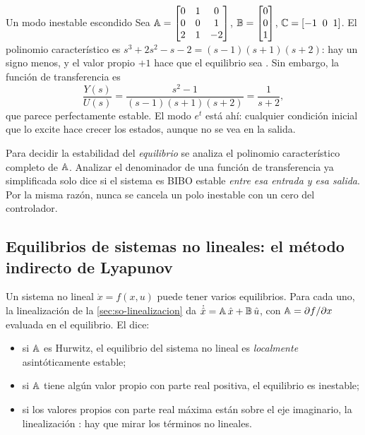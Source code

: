 \begin{ejemplo}[label=ej:es-escondido]{Un modo inestable escondido}
Sea $\mathbb{A}=\begin{bmatrix}0&1&0\\0&0&1\\2&1&-2\end{bmatrix}$, $\mathbb{B}=\begin{bmatrix}0\\0\\1\end{bmatrix}$, $\mathbb{C}=[-1\;\;0\;\;1]$.
\solucion El polinomio característico es $s^3+2s^2-s-2=(s-1)(s+1)(s+2)$: hay un signo menos, y el valor propio $+1$ hace que el equilibrio sea . Sin embargo, la función de transferencia es
\[
  \frac{Y(s)}{U(s)}=\frac{s^2-1}{(s-1)(s+1)(s+2)}=\frac{1}{s+2},
\]
que parece perfectamente estable. El modo $e^{t}$ está ahí: cualquier condición inicial que lo excite hace crecer los estados, aunque no se vea en la salida.
\end{ejemplo}

\begin{cuidado}
Para decidir la estabilidad del \emph{equilibrio} se analiza el polinomio característico completo de $\mathbb{A}$. Analizar el denominador de una función de transferencia ya simplificada solo dice si el sistema es BIBO estable \emph{entre esa entrada y esa salida}. Por la misma razón, nunca se cancela un polo inestable con un cero del controlador.
\end{cuidado}


\subsection*{Equilibrios de sistemas no lineales: el método indirecto de Lyapunov}

Un sistema no lineal $\dot x=f(x,u)$ puede tener varios equilibrios. Para cada uno, la linealización de la \cref{sec:so-linealizacion} da $\dot{\hat{x}}=\mathbb{A}\,\hat{x}+\mathbb{B}\,\hat{u}$, con $\mathbb{A}=\partial f/\partial x$ evaluada en el equilibrio. El  dice:
\begin{itemize}
  \item si $\mathbb{A}$ es Hurwitz, el equilibrio del sistema no lineal es \emph{localmente} asintóticamente estable;
  \item si $\mathbb{A}$ tiene algún valor propio con parte real positiva, el equilibrio es inestable;
  \item si los valores propios con parte real máxima están sobre el eje imaginario, la linealización : hay que mirar los términos no lineales.
\end{itemize}

